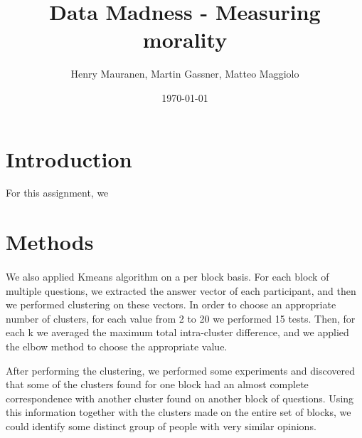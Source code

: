 \documentclass{article}
\title{Data Madness - Measuring morality}
\date{\today}
\author{Henry Mauranen, Martin Gassner, Matteo Maggiolo}
\begin{document}
\maketitle

\section{Introduction}
For this assignment, we 


\section{Methods}

\paragraph{}
We also applied Kmeans algorithm on a per block basis. For each block of multiple questions, we extracted the answer vector of each participant, and then we performed clustering on these vectors. In order to choose an appropriate number of clusters, for each value from 2 to 20 we performed 15 tests. Then, for each k we averaged the maximum total intra-cluster difference, and we applied the elbow method to choose the appropriate value.

After performing the clustering, we performed some experiments and discovered that some of the clusters found for one block had an almost complete correspondence with another cluster found on another block of questions. Using this information together with the clusters made on the entire set of blocks, we could identify some distinct group of people with very similar opinions.
\end{document}
